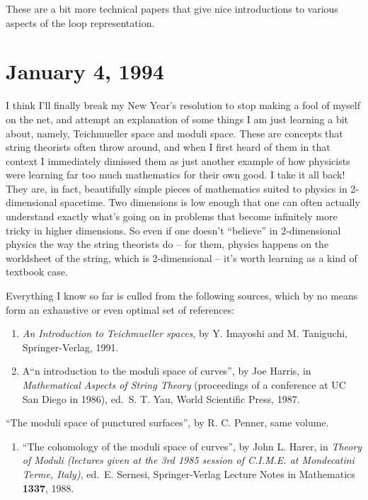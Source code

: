 \documentclass{article}
\def\tightlist{}
\begin{document}
These are a bit more technical papers that give nice introductions to
various aspects of the loop representation.
\hypertarget{week28}{%
\section{January 4, 1994}\label{week28}}

I think I'll finally break my New Year's resolution to stop making a
fool of myself on the net, and attempt an explanation of some things I
am just learning a bit about, namely, Teichmueller space and moduli
space. These are concepts that string theorists often throw around, and
when I first heard of them in that context I immediately dimissed them
as just another example of how physicists were learning far too much
mathematics for their own good. I take it all back! They are, in fact,
beautifully simple pieces of mathematics suited to physics in
2-dimensional spacetime. Two dimensions is low enough that one can often
actually understand exactly what's going on in problems that become
infinitely more tricky in higher dimensions. So even if one doesn't
``believe'' in 2-dimensional physics the way the string theorists do --
for them, physics happens on the worldsheet of the string, which is
2-dimensional -- it's worth learning as a kind of textbook case.

Everything I know so far is culled from the following sources, which by
no means form an exhaustive or even optimal set of references:

\begin{enumerate}
\def\labelenumi{\arabic{enumi})}
\item
  \emph{An Introduction to Teichmueller spaces}, by Y. Imayoshi and M.
  Taniguchi, Springer-Verlag, 1991.
\item
  A``n introduction to the moduli space of curves'', by Joe Harris, in
  \emph{Mathematical Aspects of String Theory} (proceedings of a
  conference at UC San Diego in 1986), ed.~S. T. Yau, World Scientific
  Press, 1987.
\end{enumerate}

``The moduli space of punctured surfaces'', by R. C. Penner, same
volume.

\begin{enumerate}
\def\labelenumi{\arabic{enumi})}
\setcounter{enumi}{2}
\tightlist
\item
  ``The cohomology of the moduli space of curves'', by John L. Harer, in
  \emph{Theory of Moduli (lectures given at the 3rd 1985 session of
  C.I.M.E. at Mondecatini Terme, Italy)}, ed.~E. Sernesi,
  Springer-Verlag Lecture Notes in Mathematics \textbf{1337}, 1988.
\end{enumerate}
\end{document}
